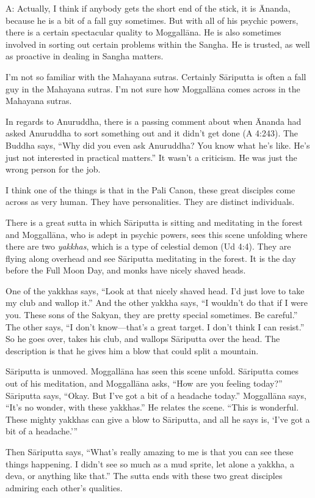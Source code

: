 \qaspace
A: Actually, I think if anybody gets the short end of the stick, it is
Ānanda, because he is a bit of a fall guy sometimes. But with all of his
psychic powers, there is a certain spectacular quality to Moggallāna. He
is also sometimes involved in sorting out certain problems within the
Sangha. He is trusted, as well as proactive in dealing in Sangha
matters.

I’m not so familiar with the Mahayana sutras. Certainly Sāriputta is
often a fall guy in the Mahayana sutras. I’m not sure how Moggallāna
comes across in the Mahayana sutras.

In regards to Anuruddha, there is a passing comment about when Ānanda
had asked Anuruddha to sort something out and it didn’t get done (A
4:243). The Buddha says, “Why did you even ask Anuruddha? You know what
he’s like. He’s just not interested in practical matters.” It wasn’t a
criticism. He was just the wrong person for the job.

I think one of the things is that in the Pali Canon, these great
disciples come across as very human. They have personalities. They are
distinct individuals.

There is a great sutta in which Sāriputta is sitting and meditating in
the forest and Moggallāna, who is adept in psychic powers, sees this
scene unfolding where there are two \emph{yakkhas}, which is a type of
celestial demon (Ud 4:4). They are flying along overhead and see
Sāriputta meditating in the forest. It is the day before the Full Moon
Day, and monks have nicely shaved heads.

One of the yakkhas says, “Look at that nicely shaved head. I’d just love
to take my club and wallop it.” And the other yakkha says, “I wouldn’t
do that if I were you. These sons of the Sakyan, they are pretty special
sometimes. Be careful.” The other says, “I don’t know—that’s a great
target. I don’t think I can resist.” So he goes over, takes his club,
and wallops Sāriputta over the head. The description is that he gives
him a blow that could split a mountain.

Sāriputta is unmoved. Moggallāna has seen this scene unfold. Sāriputta
comes out of his meditation, and Moggallāna asks, “How are you feeling
today?” Sāriputta says, “Okay. But I’ve got a bit of a headache today.”
Moggallāna says, “It’s no wonder, with these yakkhas.” He relates the
scene. “This is wonderful. These mighty yakkhas can give a blow to
Sāriputta, and all he says is, ‘I’ve got a bit of a headache.’”

Then Sāriputta says, “What’s really amazing to me is that you can see
these things happening. I didn’t see so much as a mud sprite, let alone
a yakkha, a deva, or anything like that.” The sutta ends with these two
great disciples admiring each other’s qualities.

